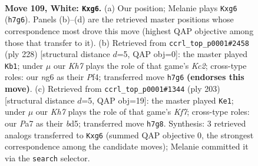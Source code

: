 \documentclass[11pt]{article}
\begin{document}
\clearpage

\begin{figure}[p]\centering
\begin{subfigure}{0.46\textwidth}\centering
\resizebox{\linewidth}{!}{%
\newchessgame
\chessboard[
  setfen={4k3/P6K/6n1/8/8/8/8/8 w - - 8 109},
  showmover=false,
  pgfstyle=straightmove, color=movearrow, markmove={h7-g6}
]}
\caption{}
\end{subfigure}\hfill
\begin{subfigure}{0.46\textwidth}\centering
\resizebox{\linewidth}{!}{%
\newchessgame
\chessboard[
  setfen={8/8/8/2k5/5P2/8/2K5/8 w - - 0 115},
  showmover=false,
  pgfstyle=straightmove, color=movearrow, markmove={c2-b1}
]}
\caption{}
\end{subfigure}
\\[4pt]
\begin{subfigure}{0.46\textwidth}\centering
\resizebox{\linewidth}{!}{%
\newchessgame
\chessboard[
  setfen={8/8/8/3B4/8/3K4/4Nk2/8 b - - 31 102},
  showmover=false,
  pgfstyle=straightmove, color=movearrow, markmove={f2-e1}
]}
\caption{}
\end{subfigure}\hfill

\caption{\textbf{Move 109, White: \texttt{Kxg6}.} (a) Our position; Melanie plays \texttt{Kxg6} (\texttt{h7g6}). Panels (b)--(d) are the retrieved master positions whose correspondence most drove this move (highest QAP objective among those that transfer to it). (b) Retrieved from \texttt{ccrl\_top\_p0001\#2458} (ply 228) [structural distance $d$=5, QAP obj=0]: the master played \texttt{Kb1}; under $\mu$ our \emph{Kh7} plays the role of that game's \emph{Kc2}; cross-type roles: our \emph{n}g6 as their \emph{P}f4; transferred move \texttt{h7g6} \textbf{(endorses this move)}. (c) Retrieved from \texttt{ccrl\_top\_p0001\#1344} (ply 203) [structural distance $d$=5, QAP obj=19]: the master played \texttt{Ke1}; under $\mu$ our \emph{Kh7} plays the role of that game's \emph{Kf7}; cross-type roles: our \emph{P}a7 as their \emph{b}d5; transferred move \texttt{h7g8}. Synthesis: 3 retrieved analogs transferred to \texttt{Kxg6} (summed QAP objective 0, the strongest correspondence among the candidate moves); Melanie committed it via the \texttt{search} selector.}
\label{fig:thought-m216}
\end{figure}

\clearpage
\end{document}
